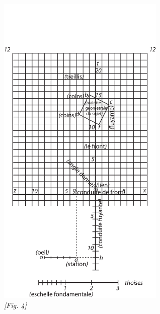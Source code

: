 \begin{center}     
\includegraphics[width=0.6\textwidth]{images/T12-Desargues}
\\\textit{[Fig. 4]}
\end{center}
                    